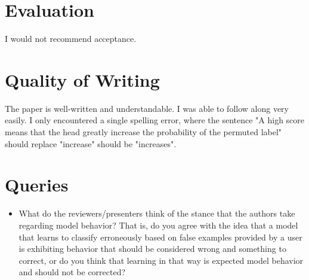 \documentclass{IEEEtran}
\begin{document}
\section{Evaluation}
I would not recommend acceptance.

\section{Quality of Writing}
The paper is well-written and understandable. 
I was able to follow along very easily.
I only encountered a single spelling error, where the sentence "A high score means that the head greatly increase the probability of the permuted label" should replace "increase" should be "increases".

\section{Queries}
\begin{itemize}
    \item What do the reviewers/presenters think of the stance that the authors take regarding model behavior?
    That is, do you agree with the idea that a model that learns to classify erroneously based on false examples provided by a user is exhibiting behavior that should be considered wrong and something to correct, or do you think that learning in that way is expected model behavior and should not be corrected?
\end{itemize}
\end{document}
